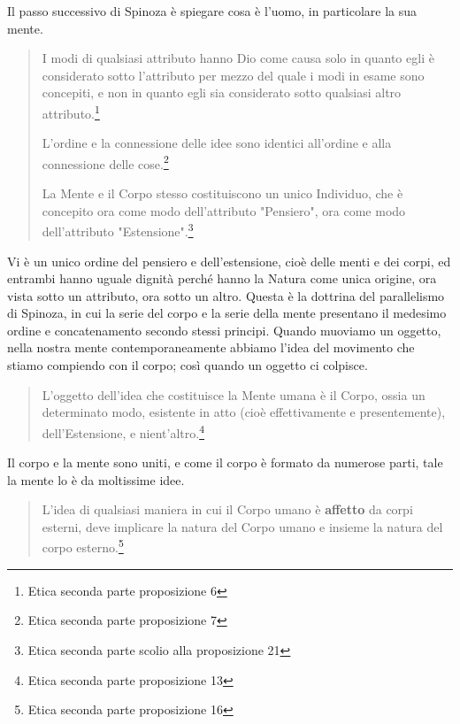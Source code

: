 Il passo successivo di Spinoza è spiegare cosa è l'uomo, in particolare la sua mente.

\begin{quotation}
	\small I modi di qualsiasi attributo hanno Dio come causa solo in quanto egli è considerato sotto l’attributo per mezzo del quale i modi in esame sono concepiti, e non in quanto egli sia considerato sotto qualsiasi altro attributo.\footnote{Etica seconda parte proposizione 6}
	
	\small L’ordine e la connessione delle idee sono identici all’ordine e alla connessione delle cose.\footnote{Etica seconda parte proposizione 7}
	
	\small La Mente e il Corpo stesso costituiscono un unico Individuo,
	che è concepito ora come modo dell’attributo "Pensiero", ora come modo dell’attributo "Estensione".\footnote{Etica seconda parte scolio alla proposizione 21}
	
\end{quotation}
Vi è un unico ordine del pensiero e dell'estensione, cioè delle menti e dei corpi, ed entrambi hanno uguale dignità perché hanno la Natura come unica origine, ora vista sotto un attributo, ora sotto un altro. Questa è la dottrina del parallelismo di Spinoza, in cui la serie del corpo e la serie della mente presentano il medesimo ordine e concatenamento secondo stessi principi. Quando muoviamo un oggetto, nella nostra mente contemporaneamente abbiamo l'idea del movimento che stiamo compiendo con il corpo; così quando un oggetto ci colpisce.

\begin{quotation}
	\small L’oggetto dell’idea che costituisce la Mente umana è il Corpo, ossia un determinato modo, esistente in atto (cioè effettivamente e presentemente), dell’Estensione, e nient’altro.\footnote{Etica seconda parte proposizione 13}
\end{quotation}

Il corpo e la mente sono uniti, e come il corpo è formato da numerose parti, tale la mente lo è da moltissime idee.

\begin{quotation}
	\small L’idea di qualsiasi maniera in cui il Corpo umano è \textbf{affetto} da corpi esterni, deve implicare la natura del Corpo umano e insieme la natura del corpo esterno.\footnote{Etica seconda parte proposizione 16}
\end{quotation}

